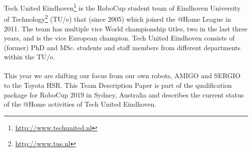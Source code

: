 Tech United Eindhoven\footnote{\url{http://www.techunited.nl}} is the RoboCup student team of Eindhoven University of Technology\footnote{\url{http://www.tue.nl}} (TU/e) that (since 2005) which joined the @Home League in 2011. 
The team has multiple vice World championship titles, two in the last three years, and is the vice European champion. 
Tech United Eindhoven consists of (former) PhD and MSc. students and staff members from different departments within the TU/e.
\\
\\
This year we are shifting our focus from our own robots, AMIGO and SERGIO to the Toyota HSR.
This Team Description Paper is part of the qualification package for RoboCup 2019 in Sydney, Australia and describes the current status of the @Home activities of Tech United Eindhoven.
